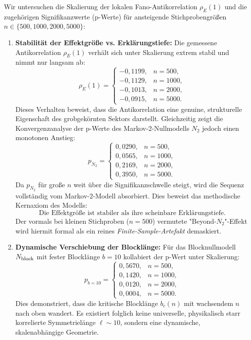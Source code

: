 \documentclass[11pt,a4paper]{article}
\theoremstyle{definition}
\begin{document}
	Wir untersuchen die Skalierung der lokalen Fano-Antikorrelation $\rho_E(1)$ und die zugehörigen Signifikanzwerte (p-Werte) für ansteigende Stichprobengrößen $n \in \{500, 1000, 2000, 5000\}$:
	\begin{enumerate}
		\item \textbf{Stabilität der Effektgröße vs. Erklärungstiefe:}
		Die gemessene Antikorrelation $\rho_E(1)$ verhält sich unter Skalierung extrem stabil und nimmt nur langsam ab:
		\begin{equation}
			\rho_E(1) = 
			\begin{cases} 
				-0{,}1199, & n = 500, \\ 
				-0{,}1129, & n = 1000, \\ 
				-0{,}1013, & n = 2000, \\
				-0{,}0915, & n = 5000.
			\end{cases}
		\end{equation}
		Dieses Verhalten beweist, dass die Antikorrelation eine genuine, strukturelle Eigenschaft des grobgekörnten Sektors darstellt. Gleichzeitig zeigt die Konvergenzanalyse der p-Werte des Markov-2-Nullmodells $N_2$ jedoch einen monotonen Anstieg:
		\begin{equation}
			p_{N_2} = 
			\begin{cases} 
				0{,}0290, & n = 500, \\ 
				0{,}0565, & n = 1000, \\ 
				0{,}2169, & n = 2000, \\
				0{,}3950, & n = 5000.
			\end{cases}
		\end{equation}
		Da $p_{N_2}$ für große $n$ weit über die Signifikanzschwelle steigt, wird die Sequenz vollständig vom Markov-2-Modell absorbiert. Dies beweist das methodische Kernaxiom des Modells:
		\begin{equation}
			\boxed{\text{Die Effektgröße ist stabiler als ihre scheinbare Erklärungstiefe.}}
		\end{equation}
		Der vormals bei kleinen Stichproben ($n=500$) vermutete "Beyond-$N_2$"-Effekt wird hiermit formal als ein reines \emph{Finite-Sample-Artefakt} demaskiert.
		
		\item \textbf{Dynamische Verschiebung der Blocklänge:}
		Für das Blocknullmodell $N_{\rm block}$ mit fester Blocklänge $b=10$ kollabiert der p-Wert unter Skalierung:
		\begin{equation}
			p_{b=10} = 
			\begin{cases} 
				0{,}5670, & n = 500, \\ 
				0{,}1420, & n = 1000, \\ 
				0{,}0120, & n = 2000, \\
				0{,}0004, & n = 5000.
			\end{cases}
		\end{equation}
		Dies demonstriert, dass die kritische Blocklänge $b_c(n)$ mit wachsendem $n$ nach oben wandert. Es existiert folglich keine universelle, physikalisch starr korrelierte Symmetrielänge $\ell \sim 10$, sondern eine dynamische, skalenabhängige Geometrie.
		

\end{enumerate}
\end{document}
